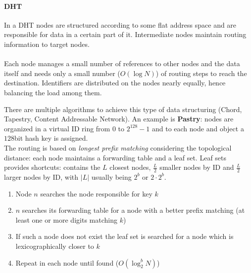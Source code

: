 \paragraph{DHT}
In a DHT nodes are structured according to some flat address space and are responsible for data in a certain part of it. Intermediate nodes maintain routing information to target nodes.\\\\
Each node manages a small number of references to other nodes and the data itself and needs only a small number ($O(\log N)$) of routing steps to reach the destination. Identifiers are distributed on the nodes nearly equally, hence balancing the load among them.

There are multiple algorithms to achieve this type of data structuring (Chord, Tapestry, Content Addressable Network). An example is \textbf{Pastry}: nodes are organized in a virtual ID ring from $0$ to $2^{128}-1$ and to each node and object a $128$bit hash key is assigned.\\
The routing is based on \textit{longest prefix matching} considering the topological distance: each node maintains a forwarding table and a leaf set. Leaf sets provides shortcuts: contains the $L$ closest nodes, $\frac{L}{2}$ smaller nodes by ID and $\frac{L}{2}$ larger nodes by ID, with $\lvert L \rvert$ usually being $2^b$ or $2 \cdot 2^b$.
\begin{enumerate}
	\item Node $n$ searches the node responsible for key $k$
	\item $n$ searches its forwarding table for a node with a better prefix matching (at least one or more digits matching $k$)
	\item If such a node does not exist the leaf set is searched for a node which is lexicographically closer to $k$
	\item Repeat in each node until found ($O(\log_2^b N)$)
\end{enumerate}

